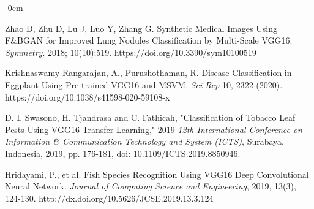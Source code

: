 \documentclass[journal,article,submit,pdftex,moreauthors]{Definitions/mdpi}
\begin{document}
\begin{adjustwidth}{-\extralength}{0cm}
\begin{thebibliography}{999}
Zhao D, Zhu D, Lu J, Luo Y, Zhang G. Synthetic Medical Images Using F\&BGAN for Improved Lung Nodules Classification by Multi-Scale VGG16. \textit{Symmetry}. 2018; 10(10):519. https://doi.org/10.3390/sym10100519

Krishnaswamy Rangarajan, A., Purushothaman, R. Disease Classification in Eggplant Using Pre-trained VGG16 and MSVM. \textit{Sci Rep} 10, 2322 (2020). https://doi.org/10.1038/s41598-020-59108-x

D. I. Swasono, H. Tjandrasa and C. Fathicah, "Classification of Tobacco Leaf Pests Using VGG16 Transfer Learning," 2019 \textit{12th International Conference on Information & Communication Technology and System (ICTS)}, Surabaya, Indonesia, 2019, pp. 176-181, doi: 10.1109/ICTS.2019.8850946.

Hridayami, P., et al. Fish Species Recognition Using VGG16 Deep Convolutional Neural Network. \textit{Journal of Computing Science and Engineering}, 2019, 13(3), 124-130. http://dx.doi.org/10.5626/JCSE.2019.13.3.124

\end{thebibliography}
\end{adjustwidth}
\end{document}

